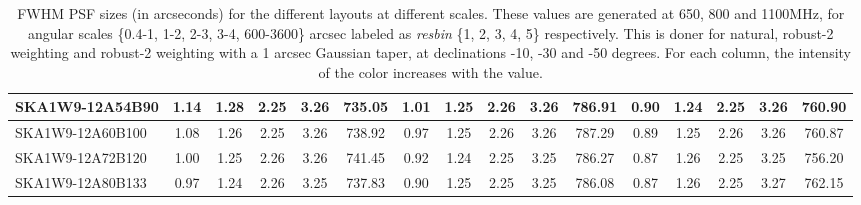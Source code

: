 \begin{table}[H]
{{\begin{tabular}{|lccccc||ccccc||ccccc|}
SKA1W9-12A54B90 & 1.14 \cellcolor{blue!60.00} & 1.28 \cellcolor{red!44.26} & 2.25 \cellcolor{green!18.00} & 3.26 \cellcolor{orange!51.37} & 735.05 \cellcolor{purple!18.00} & 1.01 \cellcolor{blue!60.00} & 1.25 \cellcolor{red!23.29} & 2.26 \cellcolor{green!40.29} & 3.26 \cellcolor{orange!55.70} & 786.91 \cellcolor{purple!30.51} & 0.90 \cellcolor{blue!43.92} & 1.24 \cellcolor{red!18.00} & 2.25 \cellcolor{green!37.16} & 3.26 \cellcolor{orange!30.99} & 760.90 \cellcolor{purple!51.16}\\ \hline 
SKA1W9-12A60B100 & 1.08 \cellcolor{blue!45.13} & 1.26 \cellcolor{red!27.99} & 2.25 \cellcolor{green!24.68} & 3.26 \cellcolor{orange!44.60} & 738.92 \cellcolor{purple!37.66} & 0.97 \cellcolor{blue!45.35} & 1.25 \cellcolor{red!20.11} & 2.26 \cellcolor{green!50.57} & 3.26 \cellcolor{orange!60.00} & 787.29 \cellcolor{purple!36.28} & 0.89 \cellcolor{blue!32.66} & 1.25 \cellcolor{red!28.80} & 2.26 \cellcolor{green!53.74} & 3.26 \cellcolor{orange!26.35} & 760.87 \cellcolor{purple!50.99}\\ \hline 
SKA1W9-12A72B120 & 1.00 \cellcolor{blue!27.05} & 1.25 \cellcolor{red!19.24} & 2.26 \cellcolor{green!59.52} & 3.26 \cellcolor{orange!49.50} & 741.45 \cellcolor{purple!50.58} & 0.92 \cellcolor{blue!26.50} & 1.24 \cellcolor{red!18.00} & 2.25 \cellcolor{green!26.57} & 3.25 \cellcolor{orange!28.02} & 786.27 \cellcolor{purple!20.84} & 0.87 \cellcolor{blue!20.99} & 1.26 \cellcolor{red!40.01} & 2.25 \cellcolor{green!18.00} & 3.25 \cellcolor{orange!18.00} & 756.20 \cellcolor{purple!18.00}\\ \hline 
SKA1W9-12A80B133 & 0.97 \cellcolor{blue!18.00} & 1.24 \cellcolor{red!18.00} & 2.26 \cellcolor{green!39.95} & 3.25 \cellcolor{orange!18.00} & 737.83 \cellcolor{purple!32.15} & 0.90 \cellcolor{blue!18.00} & 1.25 \cellcolor{red!26.75} & 2.25 \cellcolor{green!18.00} & 3.25 \cellcolor{orange!18.00} & 786.08 \cellcolor{purple!18.00} & 0.87 \cellcolor{blue!18.00} & 1.26 \cellcolor{red!42.98} & 2.25 \cellcolor{green!34.95} & 3.27 \cellcolor{orange!60.00} & 762.15 \cellcolor{purple!60.00}\\ \hline 
\end{tabular}}
\vspace{-0.300000cm}
\hspace{1cm} 

\vspace{.25cm}
\caption{FWHM PSF sizes (in arcseconds) for the different layouts at different scales. These values are generated at 650, 800 and 1100MHz, for angular scales \{0.4-1, 1-2, 2-3, 3-4, 600-3600\} arcsec labeled as {\it resbin} \{1, 2, 3, 4, 5\} respectively. This is doner for natural, robust-2 weighting and robust-2 weighting with a 1 arcsec Gaussian taper, at declinations -10, -30 and -50 degrees. For each column, the intensity of the color increases with the value.}\label{tab:psf_mean}}
 \end{table}
